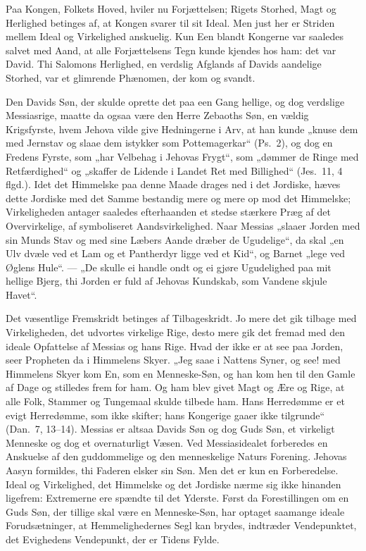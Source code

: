 \documentclass[12pt]{book}
\begin{document}
Paa Kongen, Folkets Hoved, hviler nu Forjættelsen; Rigets Storhed,
Magt og Herlighed betinges af, at Kongen svarer til sit Ideal. Men
just her er Striden mellem Ideal og Virkelighed anskuelig. Kun Een
blandt Kongerne var saaledes salvet med Aand, at alle Forjættelsens
Tegn kunde kjendes hos ham: det var David. Thi Salomons Herlighed,
en verdslig Afglands af Davids aandelige Storhed, var et glimrende
Phænomen, der kom og svandt.

Den Davids Søn, der skulde oprette det paa een Gang hellige, og dog
verdslige Messiasrige, maatte da ogsaa være den Herre Zebaoths Søn,
en vældig Krigsfyrste, hvem Jehova vilde give Hedningerne i Arv, at
han kunde „knuse dem med Jernstav og slaae dem istykker som
Pottemagerkar“ (Ps.\ 2), og dog en Fredens Fyrste, som „har Velbehag
i Jehovas Frygt“, som „dømmer de Ringe med Retfærdighed“ og „skaffer
de Lidende i Landet Ret med Billighed“ (Jes.\ 11, 4 flgd.). Idet det
Himmelske paa denne Maade drages ned i det Jordiske, hæves dette
Jordiske med det Samme bestandig mere og mere op mod det Himmelske;
Virkeligheden antager saaledes efterhaanden et stedse stærkere Præg
af det Overvirkelige, af symboliseret Aandsvirkelighed. Naar Messias
„slaaer Jorden med sin Munds Stav og med sine Læbers Aande dræber de
Ugudelige“, da skal „en Ulv dvæle ved et Lam og et Pantherdyr ligge
ved et Kid“, og Barnet
„lege ved Øglens Hule“. --- „De skulle ei handle ondt og ei gjøre
Ugudelighed paa mit hellige Bjerg, thi Jorden er fuld af Jehovas
Kundskab, som Vandene skjule Havet“.

Det væsentlige Fremskridt betinges af Tilbageskridt. Jo mere det gik
tilbage med Virkeligheden, det udvortes virkelige Rige, desto mere
gik det fremad med den ideale Opfattelse af Messias og hans Rige.
Hvad der ikke er at see paa Jorden, seer Propheten da i Himmelens
Skyer. „Jeg saae i Nattens Syner, og see! med Himmelens Skyer kom
En, som en Menneske-Søn, og han kom hen til den Gamle af Dage og
stilledes frem for ham. Og ham blev givet Magt og Ære og Rige, at
alle Folk, Stammer og Tungemaal skulde tilbede ham. Hans Herredømme
er et evigt Herredømme, som ikke skifter; hans Kongerige gaaer ikke
tilgrunde“ (Dan.\ 7, 13--14). Messias er altsaa Davids Søn og dog
Guds Søn, et virkeligt Menneske og dog et overnaturligt Væsen. Ved
Messiasidealet forberedes en Anskuelse af den guddommelige og den
menneskelige Naturs Forening. Jehovas Aasyn formildes, thi Faderen
elsker sin Søn. Men det er kun en Forberedelse. Ideal og
Virkelighed, det Himmelske og det Jordiske nærme sig ikke hinanden
ligefrem: Extremerne ere spændte til det Yderste. Først da
Forestillingen om en Guds Søn, der tillige skal være en
Menneske-Søn, har optaget saamange ideale Forudsætninger, at
Hemmelighedernes Segl kan brydes, indtræder Vendepunktet, det
Evighedens Vendepunkt, der er Tidens Fylde.
\end{document}
